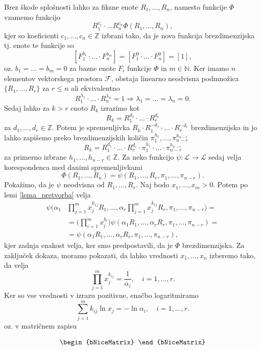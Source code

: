 \documentclass[mat2, tisk]{fmfdelo}
\newcommand{\N}{\mathbb N}
\newcommand{\Z}{\mathbb Z}
\begin{document}
\begin{dokaz}
Brez škode splošnosti lahko za fiksne enote $R_1, \dots, R_n$, namesto funkcije $\Phi$ vzamemo funkcijo 
$$
R_1^{c_1} \cdot \ldots R_n^{c_n} \Phi(R_1, \dots, R_n),
$$
kjer so koeficienti $c_1, \dots, c_n \in \Z$ izbrani tako, da je 
nova funkcija brezdimenzijska tj. enote te funkcije so 
$$
[F_1^{b_1} \cdot \ldots \cdot F_n^{b_m}] = [F_1^0 \cdot \ldots \cdot F_n^{0}] = [1],
$$
oz. $b_1 = \dots = b_m = 0$ za bazne enote $F_i$ funkcije $\Phi$ in $m\in \N$.
Ker imamo $n$ elementov vektorskega prostora $\mathcal{F}$, obstaja 
linearno neodvisna podmnožica $\{R_1, \dots, R_r\}$ za $r \leq n$ ali 
ekvivalentno 
$$
R_1^{\lambda_1} \cdot \ldots \cdot R_n^{\lambda_n} = 1 \Longrightarrow \lambda_1 = \dots = \lambda_n = 0.
$$
Sedaj lahko za $k > r$ enoto $R_k$ izrazimo kot 
$$
R_k = R_1^{d_1}\cdot \ldots \cdot R_r^{d_r}
$$
za $d_1, \dots, d_r \in \Z$. Potem je spremenljivka 
$R_k \cdot R_1^{-d_1}\cdot \ldots \cdot R_r^{-d_r}$ brezdimenzijska 
in jo lahko zapišemo preko brezdimenzijskih količin $\pi_1^{h_1}, \dots, \pi_{n-r}^{h_{n-r}}$
$$
R_k = R_1^{d_1}\cdot \ldots \cdot R_r^{d_r} \cdot \pi_1^{h_1} \cdot \ldots \cdot \pi_{n-r}^{h_{n-r}}
$$
za primerno izbrane $h_1, \dots, h_{n-r} \in \Z$. Za neko funkcijo
$\psi: \mathcal{L} \rightarrow \mathcal{L}$ sedaj velja korespondenca med 
danimi spremenljivkami 
$$
\Phi(R_1, \dots, R_n) = \psi(R_1, \dots, R_r, \pi_1, \dots, \pi_{n-r}).
$$
Pokažimo, da je $\psi$ neodvisna od $R_1, \dots, R_r$. Naj bodo 
$x_1, \dots, x_m > 0$. Potem po lemi \ref{lema_pretvorba} velja 
\begin{align*}
\psi\Big(\alpha_1 &\prod_{j=1}^m x_j^{k_{1j}} R_1, \dots, \alpha_r \prod_{j=1}^m x_j^{k_{rj}} R_r, \pi_1, \dots, \pi_{n-r}\Big) = \\
&= \Big(\prod_{i=1}^m x_i^{b_i}\Big) \psi(\alpha_1 R_1, \dots, \alpha_r R_r, \pi_1, \dots, \pi_{n-r}) = \\
&= \psi(\alpha_1 R_1, \dots, \alpha_r R_r, \pi_1, \dots, \pi_{n-r}),
\end{align*}
kjer zadnja enakost velja, ker smo predpostavili, da je $\Phi$ brezdimenzijska.
Za zaključek dokaza, moramo pokazati, da lahko vrednosti $x_1, \dots, x_n$
izberemo tako, da velja 
$$
\prod_{j=1}^m x_j^{k_{ij}} = \frac{1}{\alpha_i}, \quad i = 1, \dots, r.
$$
Ker so vse vrednosti v izrazu pozitivne, enačbo logaritmiramo 
$$
\sum_{j=1}^m k_{ij} \ln{x_j} = - \ln{\alpha_i},  \quad i = 1, \dots, r.
$$
oz. v matričnem zapisu 
\begin{NiceMatrixBlock}
\[
\begin{bNiceMatrix}

\end{bNiceMatrix}\]
\end{NiceMatrixBlock}
\end{dokaz}
\end{document}
